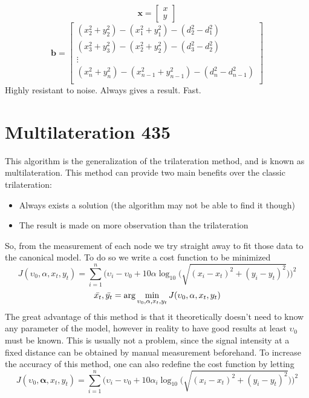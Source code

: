 \documentclass[12pt,twoside]{report}
\begin{document}
$$\mathbf{x}=\begin{bmatrix}
x\\
y
\end{bmatrix}$$
$$\mathbf{b}=\begin{bmatrix}
(x^2_2+y^2_2)-(x_1^2+y^2_1)-(d_2^2-d_1^2)\\
(x^2_3+y^2_3)-(x_2^2+y^2_2)-(d_3^2-d_2^2)\\
\vdots\\
(x^2_n+y^2_n)-(x_{n-1}^2+y^2_{n-1})-(d_n^2-d_{n-1}^2)\\
\end{bmatrix}$$
Highly resistant to noise. Always gives a result. Fast.
\clearpage


\section{Multilateration 435}
This algorithm is the generalization of the trilateration method, and is known as multilateration. 
This method can provide two main benefits over the classic trilateration:
\begin{itemize}
    \item Always exists a solution (the algorithm may not be able to find it though)
    \item The result is made on more observation than the trilateration
\end{itemize}
So, from the measurement of each node we try straight away to fit those data to the canonical model. To do so we write a cost function to be minimized
\begin{equation}
    J(\upsilon_0,\alpha,x_t,y_t)=\sum_{i=1}^n\bigg(\upsilon_i-\upsilon_0+10\alpha\log_{10}\big(\sqrt{(x_i-x_t)^2+(y_i-y_t)^2}\big)\bigg)^2
\end{equation}
\begin{equation}
\Bar{x_t}, \Bar{y_t}=\arg \min_{\upsilon_0,\alpha,x_t,y_t}J(\upsilon_0,\alpha,x_t,y_t)
\end{equation}
The great advantage of this method is that it theoretically doesn't need to know any parameter of the model, however in reality to have good results at least $\upsilon_0$ must be known. This is usually not a problem, since the signal intensity at a fixed distance can be obtained by manual measurement beforehand.
To increase the accuracy of this method, one can also redefine the cost function by letting 
\begin{equation}
    J(\upsilon_0,\boldsymbol{\alpha},x_t,y_t)=\sum_{i=1}^n\bigg(\upsilon_i-\upsilon_0+10\alpha_i\log_{10}\big(\sqrt{(x_i-x_t)^2+(y_i-y_t)^2}\big)\bigg)^2
\end{equation}
\end{document}
